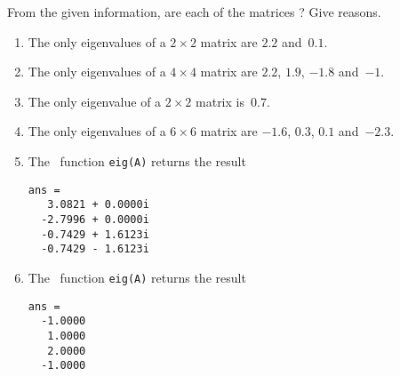 \begin{exercise}  
From the given information, are each of the matrices ?  
Give reasons.
\begin{enumerate}
\item The only eigenvalues of a \(2\times2\) matrix are \(2.2\) and~\(0.1\).

\item The only eigenvalues of a \(4\times4\) matrix are \(2.2\), \(1.9\), \(-1.8\) and~\(-1\).

\item The only eigenvalue of a \(2\times2\) matrix is~\(0.7\).

\item The only eigenvalues of a \(6\times6\) matrix are \(-1.6\), \(0.3\), \(0.1\) and~\(-2.3\).


\item The \script\ function \verb|eig(A)| returns the result
\begin{verbatim}
ans =
   3.0821 + 0.0000i
  -2.7996 + 0.0000i
  -0.7429 + 1.6123i
  -0.7429 - 1.6123i
\end{verbatim}

\item The \script\ function \verb|eig(A)| returns the result
\begin{verbatim}
ans =
  -1.0000
   1.0000
   2.0000
  -1.0000
\end{verbatim}

\end{enumerate}
\end{exercise}




